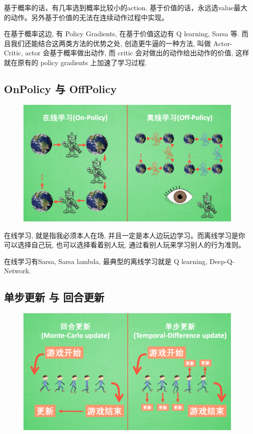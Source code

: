 \documentclass[UTF8,a4paper,12pt]{ctexbook}
\begin{document}
			基于概率的话，有几率选到概率比较小的action. 基于价值的话，永远选value最大的动作。另外基于价值的无法在连续动作过程中实现。
		
			在基于概率这边, 有 Policy Gradients, 在基于价值这边有 Q learning, Sarsa 等. 而且我们还能结合这两类方法的优势之处, 创造更牛逼的一种方法, 叫做 Actor-Critic, actor 会基于概率做出动作, 而 critic 会对做出的动作给出动作的价值, 这样就在原有的 policy gradients 上加速了学习过程.
			
		\subsection{OnPolicy  与 OffPolicy}
			\begin{figure}[H]
				\centering
				\includegraphics[width=.8\linewidth]{OnOffPolicy}
			\end{figure}

			在线学习, 就是指我必须本人在场, 并且一定是本人边玩边学习。而离线学习是你可以选择自己玩, 也可以选择看着别人玩, 通过看别人玩来学习别人的行为准则。
			
			在线学习有Sarsa, Sarsa lambda, 最典型的离线学习就是 Q learning, Deep-Q-Network.
			
		\subsection{单步更新 与  回合更新}
			\begin{figure}[H]
				\centering
				\includegraphics[width=.8\linewidth]{stepWithLoop}
			\end{figure}
		
\end{document}
